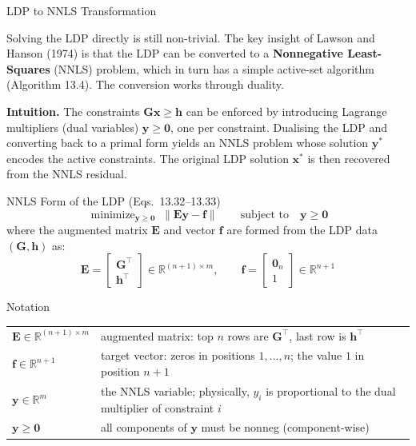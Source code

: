 \documentclass[aspectratio=169,10pt]{beamer}
\DeclareMathOperator*{\minimize}{minimize}
\newcommand{\bx}{\mathbf{x}}
\newcommand{\bG}{\mathbf{G}}
\newcommand{\bh}{\mathbf{h}}
\newcommand{\bE}{\mathbf{E}}
\newcommand{\R}{\mathbb{R}}
\newcommand{\norm}[1]{\left\|#1\right\|}
\begin{document}
\begin{frame}[allowframebreaks]{LDP to NNLS Transformation}

  Solving the LDP directly is still non-trivial.  The key insight of Lawson and
  Hanson (1974) is that the LDP can be converted to a
  \textbf{Nonnegative Least-Squares} (NNLS) problem, which in turn has a simple
  active-set algorithm (Algorithm 13.4).  The conversion works through duality.

  \textbf{Intuition.}  The constraints $\bG\bx \geq \bh$ can be enforced by
  introducing Lagrange multipliers (dual variables) $\mathbf{y} \geq \mathbf{0}$,
  one per constraint.  Dualising the LDP and converting back to a primal form
  yields an NNLS problem whose solution $\mathbf{y}^*$ encodes the active
  constraints.  The original LDP solution $\bx^*$ is then recovered from the
  NNLS residual.

  \begin{block}{NNLS Form of the LDP (Eqs.~13.32--13.33)}
    \[
      \minimize_{\mathbf{y}\geq\mathbf{0}}\; \norm{\bE\mathbf{y} - \mathbf{f}}
      \qquad \text{subject to}\quad \mathbf{y} \geq \mathbf{0}
    \]
    where the augmented matrix $\bE$ and vector $\mathbf{f}$ are formed from the
    LDP data $(\bG, \bh)$ as:
    \[
      \bE = \begin{bmatrix}\bG^{\top}\\\bh^{\top}\end{bmatrix} \in \R^{(n+1)\times m},
      \qquad
      \mathbf{f} = \begin{bmatrix}\mathbf{0}_n\\1\end{bmatrix} \in \R^{n+1}
    \]
  \end{block}

  \begin{block}{Notation}
    \begin{tabular}{ll}
      $\bE \in \R^{(n+1)\times m}$ & augmented matrix: top $n$ rows are $\bG^{\top}$, last row is $\bh^{\top}$\\
      $\mathbf{f} \in \R^{n+1}$ & target vector: zeros in positions $1,\ldots,n$; the value $1$ in position $n+1$\\
      $\mathbf{y} \in \R^m$ & the NNLS variable; physically, $y_i$ is proportional to the dual multiplier of constraint $i$\\
      $\mathbf{y} \geq \mathbf{0}$ & all components of $\mathbf{y}$ must be nonneg (component-wise)\\
    \end{tabular}
  \end{block}


\end{frame}
\end{document}
